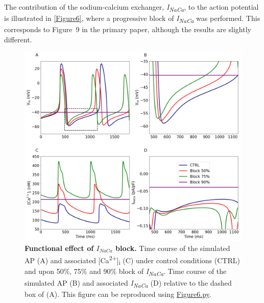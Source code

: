 \documentclass[fleqn,10pt]{physiome}
\begin{document}
The contribution of the sodium-calcium exchanger, \textit{I\textsubscript{NaCa}}, to the action potential is illustrated in \autoref{Figure6}, where a progressive block of \textit{I\textsubscript{NaCa}} was performed. This corresponds to Figure~9 in the primary paper, although the results are slightly different.\newpage

\begin{figure}[htbp]
\centering
\includegraphics[width=0.95\linewidth]{Figure6}
\caption{\textbf{Functional effect of $I_{NaCa}$ block.}\newline
Time course of the simulated AP (A) and associated [Ca\textsuperscript{2+}]\textsubscript{i} (C) under control conditions (CTRL) and upon 50\%, 75\% and 90\% block of \textit{I\textsubscript{NaCa}}. Time course of the simulated AP (B) and associated \textit{I\textsubscript{NaCa}} (D) relative to the dashed box of (A). This figure can be reproduced using \href{https://models.physiomeproject.org/workspace/648/rawfile/6784d6c3256c832dc98b2db42c85747ae2596518/Figure6.py}{Figure6.py}.}
\label{Figure6}
\end{figure}
\end{document}
